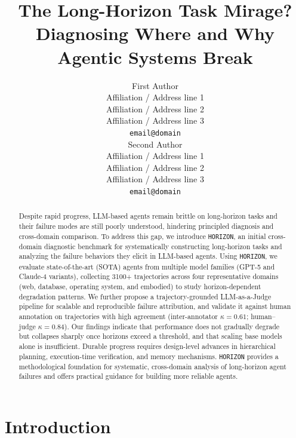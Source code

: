 \documentclass[11pt]{article}
\title{The Long-Horizon Task Mirage? \\
  Diagnosing Where and Why Agentic Systems Break}
\author{First Author \\
  Affiliation / Address line 1 \\
  Affiliation / Address line 2 \\
  Affiliation / Address line 3 \\
  \texttt{email@domain} \\\And
  Second Author \\
  Affiliation / Address line 1 \\
  Affiliation / Address line 2 \\
  Affiliation / Address line 3 \\
  \texttt{email@domain} \\}
\begin{document}
\maketitle
\begin{abstract}
Despite rapid progress, LLM-based agents remain brittle on long-horizon tasks and their failure modes are still poorly understood, hindering principled diagnosis and cross-domain comparison.
To address this gap, we introduce \texttt{HORIZON}, an initial cross-domain diagnostic benchmark for systematically constructing long-horizon tasks and analyzing the failure behaviors they elicit in LLM-based agents.
Using \texttt{HORIZON}, we evaluate state-of-the-art (SOTA) agents from multiple model families (GPT-5 and Claude-4 variants), collecting 3100+ trajectories across four representative domains (web, database, operating system, and embodied) to study horizon-dependent degradation patterns.
We further propose a trajectory-grounded LLM-as-a-Judge pipeline for scalable and reproducible failure attribution, and validate it against human annotation on trajectories with high agreement (inter-annotator $\kappa{=}0.61$; human–judge $\kappa{=}0.84$).
Our findings indicate that performance does not gradually degrade but collapses sharply once horizons exceed a threshold, and that scaling base models alone is insufficient. Durable progress requires design-level advances in hierarchical planning, execution-time verification, and memory mechanisms.
\texttt{HORIZON} provides a methodological foundation for systematic, cross-domain analysis of long-horizon agent failures and offers practical guidance for building more reliable agents.
\end{abstract}

\section{Introduction}
\end{document}
